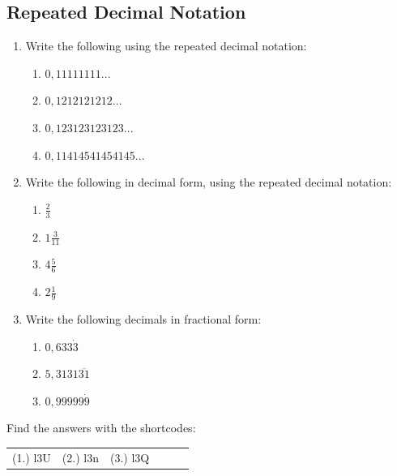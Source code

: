             \subsection{  Repeated Decimal Notation }
            \nopagebreak
      \label{m38348*id64513}\begin{enumerate}[noitemsep, label=\textbf{\arabic*}. ] 
            \label{m38348*uid23}\item Write the following using the repeated decimal notation:
\label{m38348*id64529}\begin{enumerate}[noitemsep, label=\textbf{\alph*}. ] 
            \label{m38348*uid24}\item $0,11111111...$\label{m38348*uid25}\item $0,1212121212...$\label{m38348*uid26}\item $0,123123123123...$\label{m38348*uid27}\item $0,11414541454145...$\end{enumerate}
        \label{m38348*uid28}\item Write the following in decimal form, using the repeated decimal notation:
\label{m38348*id64650}\begin{enumerate}[noitemsep, label=\textbf{\alph*}. ] 
            \label{m38348*uid29}\item $\frac{2}{3}$\label{m38348*uid30}\item $1\frac{3}{11}$\label{m38348*uid31}\item $4\frac{5}{6}$\label{m38348*uid32}\item $2\frac{1}{9}$\end{enumerate}
        \label{m38348*uid33}\item Write the following decimals in fractional form:
\label{m38348*id64767}\begin{enumerate}[noitemsep, label=\textbf{\alph*}. ] 
            \label{m38348*uid34}\item $0,633\dot{3}$\label{m38348*uid35}\item $5,3131\overline{31}$\label{m38348*uid36}\item $0,99999\dot{9}$\end{enumerate}
        \end{enumerate}
\par {} Find the answers with the shortcodes:
 \par \begin{tabular}[h]{cccccc}
 (1.) l3U  &  (2.) l3n  &  (3.) l3Q  & \end{tabular}
